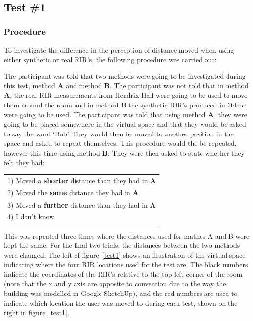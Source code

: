 \documentclass[../../main.tex]{subfiles}
\begin{document}
	\subsection{Test \#1}
	

		\subsubsection{Procedure}

			To investigate the difference in the perception of distance moved when using either synthetic or real \ac{RIR}'s, the following procedure was carried out:


			The participant was told that two methods were going to be investigated during this test, method \textbf{A} and method \textbf{B}. The participant was not told that in method \textbf{A}, the real \ac{RIR} measurements from Hendrix Hall were going to be used to move them around the room and in method \textbf{B} the synthetic \ac{RIR}'s produced in Odeon were going to be used. The participant was told that using method \textbf{A}, they were going to be placed somewhere in the virtual space and that they would be asked to say the word `Bob'. They would then be moved to another position in the space and asked to repeat themselves. This procedure would the be repeated, however this time using method \textbf{B}. They were then asked to state whether they felt they had:

			\begin{center}
			    \begin{tabular}{l}
			       1) Moved a \textbf{shorter} distance than they had in \textbf{A}\\
			       2) Moved the \textbf{same} distance they had in \textbf{A}\\
			       3) Moved a \textbf{further} distance than they had in \textbf{A}\\
			       4) I don't know\\
			    \end{tabular}
			\end{center}

			This was repeated three times where the distances used for mathes A and B were kept the same. For the final two trials, the distances between the two methods were changed. The left of figure~\ref{test1} shows an illustration of the virtual space indicating where the four \ac{RIR} locations used for the test are. The black numbers indicate the coordinates of the \ac{RIR}'s  relative to the top left corner of the room (note that the x and y axis are opposite to convention due to the way the building was modelled in Google SketchUp), and the red numbers are used to indicate which location the user was moved to during each test, shown on the right in figure~\ref{test1}.
\end{document}

